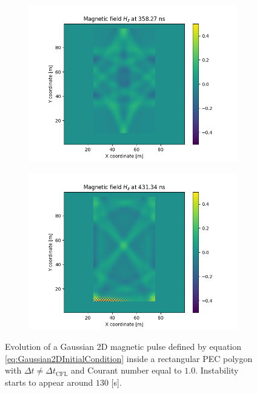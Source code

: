 \documentclass[12pt, oneside]{book}
\begin{document}
\begin{figure}[H]
    \begin{subfigure}[b]{0.45\textwidth}
        \centering
        \includegraphics[width=\textwidth]{Imagenes/CFDTD2D_GaussianInstability3.png}
    \end{subfigure}
    \begin{subfigure}[b]{0.45\textwidth}
        \centering
        \includegraphics[width=\textwidth]{Imagenes/CFDTD2D_GaussianInstability4.png}
    \end{subfigure}
    \caption{Evolution of a Gaussian 2D magnetic pulse defined by equation \ref{eq:Gaussian2DInitialCondition} inside a rectangular PEC polygon with $\Delta t \neq \Delta t_{\text{CFL}}$ and Courant number equal to $1.0$. Instability starts to appear around $130$ [s].}
    \label{fig:CFDTD2D_GaussianInstability}
\end{figure}
\end{document}
